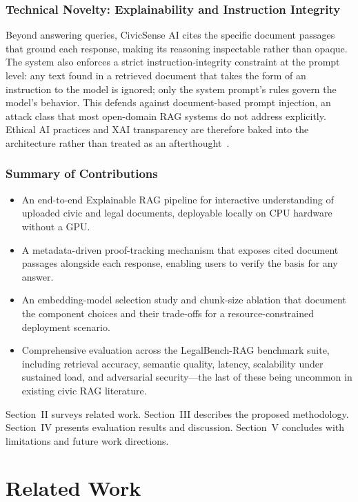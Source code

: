 \documentclass[conference]{IEEEtran}
\begin{document}
\subsubsection{Technical Novelty: Explainability and Instruction Integrity}
Beyond answering queries, CivicSense AI cites the specific document passages that ground each response, making its reasoning inspectable rather than opaque. The system also enforces a strict instruction-integrity constraint at the prompt level: any text found in a retrieved document that takes the form of an instruction to the model is ignored; only the system prompt's rules govern the model's behavior. This defends against document-based prompt injection, an attack class that most open-domain RAG systems do not address explicitly. Ethical AI practices and XAI transparency are therefore baked into the architecture rather than treated as an afterthought~\cite{b1,b5,b17}.

\subsubsection{Summary of Contributions}
\begin{itemize}
  \item An end-to-end Explainable RAG pipeline for interactive understanding of uploaded civic and legal documents, deployable locally on CPU hardware without a GPU.
  \item A metadata-driven proof-tracking mechanism that exposes cited document passages alongside each response, enabling users to verify the basis for any answer.
  \item An embedding-model selection study and chunk-size ablation that document the component choices and their trade-offs for a resource-constrained deployment scenario.
  \item Comprehensive evaluation across the LegalBench-RAG benchmark suite, including retrieval accuracy, semantic quality, latency, scalability under sustained load, and adversarial security---the last of these being uncommon in existing civic RAG literature.
\end{itemize}

Section~II surveys related work. Section~III describes the proposed methodology. Section~IV presents evaluation results and discussion. Section~V concludes with limitations and future work directions.

\section{Related Work}
\end{document}
